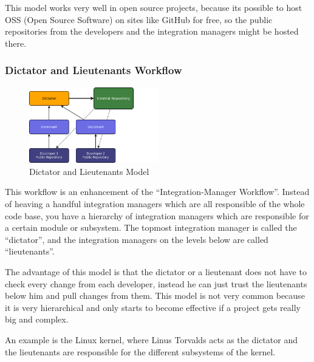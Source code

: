 This model works very well in open source projects, because its possible to host OSS (Open Source Software) on 
sites like GitHub for free, so the public repositories from the developers and the integration managers might be hosted there.


\subsubsection{Dictator and Lieutenants Workflow}

\begin{figure}[ht]
  \centering
  \includegraphics[width=0.5\textwidth]{img/Mod_Dictator}
  \caption{Dictator and Lieutenants Model}
  \label{fig:mod_dictator} 
\end{figure}

This workflow is an enhancement of the “Integration-Manager Workflow”. Instead of heaving a handful 
integration managers which are all responsible of the whole code base, you have a hierarchy of integration 
managers which are responsible for a certain module or subsystem. The topmost integration manager is called 
the “dictator”, and the integration managers on the levels below are called “lieutenants”.

The advantage of this model is that the dictator or a lieutenant does not have to check every change from 
each developer, instead he can just trust the lieutenants below him and pull changes from them. This model 
is not very common because it is very hierarchical and only starts to become effective if a project gets really big and complex.

An example is the Linux kernel, where Linus Torvalds acts as the dictator and the lieutenants are 
responsible for the different subsystems of the kernel.
